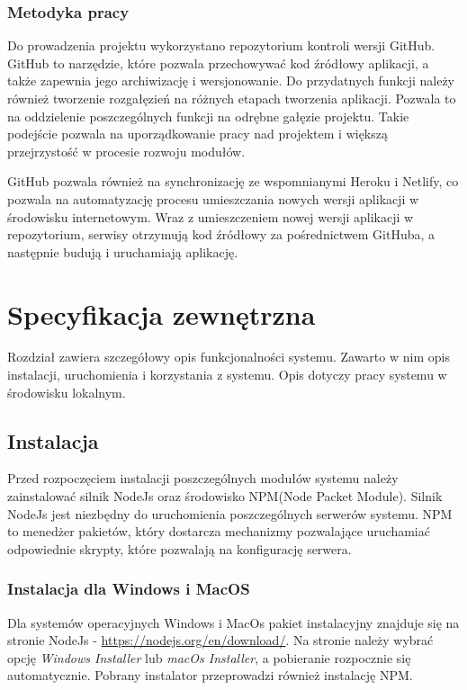 \documentclass[a4paper,12pt]{book}
\begin{document}
\subsection{Metodyka pracy}
 
Do prowadzenia projektu wykorzystano repozytorium kontroli wersji GitHub. GitHub to narzędzie, które pozwala przechowywać kod źródłowy aplikacji, a także zapewnia jego archiwizację i wersjonowanie. Do przydatnych funkcji należy również tworzenie rozgałęzień na różnych etapach tworzenia aplikacji. Pozwala to na oddzielenie poszczególnych funkcji na odrębne gałęzie projektu. Takie podejście pozwala na uporządkowanie pracy nad projektem i większą przejrzystość w procesie rozwoju modułów.
 
GitHub pozwala również na synchronizację ze wspomnianymi Heroku i Netlify, co pozwala na automatyzację procesu umieszczania nowych wersji aplikacji w środowisku internetowym. Wraz z umieszczeniem nowej wersji aplikacji w repozytorium, serwisy otrzymują kod źródłowy za pośrednictwem GitHuba, a następnie budują i uruchamiają aplikację.
 

\chapter{Specyfikacja zewnętrzna}
Rozdział zawiera szczegółowy opis funkcjonalności systemu. Zawarto w nim opis instalacji, uruchomienia i korzystania z systemu. Opis dotyczy pracy systemu w środowisku lokalnym.

\section{Instalacja}
Przed rozpoczęciem instalacji poszczególnych modułów systemu należy zainstalować silnik NodeJs oraz środowisko NPM(Node Packet Module). Silnik NodeJs jest niezbędny do uruchomienia poszczególnych serwerów systemu. NPM to menedżer pakietów, który dostarcza mechanizmy pozwalające uruchamiać odpowiednie skrypty, które pozwalają na konfigurację serwera. 

\subsection{Instalacja dla Windows i MacOS}
Dla systemów operacyjnych Windows i MacOs pakiet instalacyjny znajduje się na stronie NodeJs - \url{https://nodejs.org/en/download/}. Na stronie należy wybrać opcję \textit{Windows Installer} lub \textit{macOs Installer}, a pobieranie rozpocznie się automatycznie. Pobrany instalator przeprowadzi również instalację NPM.
\end{document}
